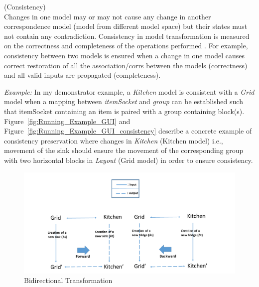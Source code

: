 \begin{defn}\label{defConsistency } (Consistency)\\
Changes in one model may or may not cause any change in another correspondence model (model from different model space) but their states must not contain any contradiction. Consistency in model transformation is measured on the correctness and completeness of the operations performed \cite{modelsynchro-tgg}. For example, consistency between two models is ensured when a change in one model causes correct  restoration of all the association/corrs between the models (correctness) and all valid inputs are propagated (completeness).
\end{defn} 

\textit{Example:} In my demonstrator example, a \textit{Kitchen} model is consistent with a \textit{Grid} model when a mapping between \textit{itemSocket} and \textit{group} can be established such that itemSocket containing an item is paired with a group containing block(s). 
Figure~\ref{fig:Running_Example_GUI} and Figure~\ref{fig:Running_Example_GUI_consistency} describe a concrete example of consistency preservation where changes in \textit{Kitchen} (Kitchen model) i.e., movement of the sink should ensure the movement of the corresponding group with two horizontal blocks in \textit{Layout} (Grid model) in order to ensure consistency.

\begin{figure}[h]
	\centering
	\includegraphics[width=1\textwidth]{figures/BX}
	\caption{Bidirectional Transformation}
	\label{fig:BX_Diagram}
\end{figure}

